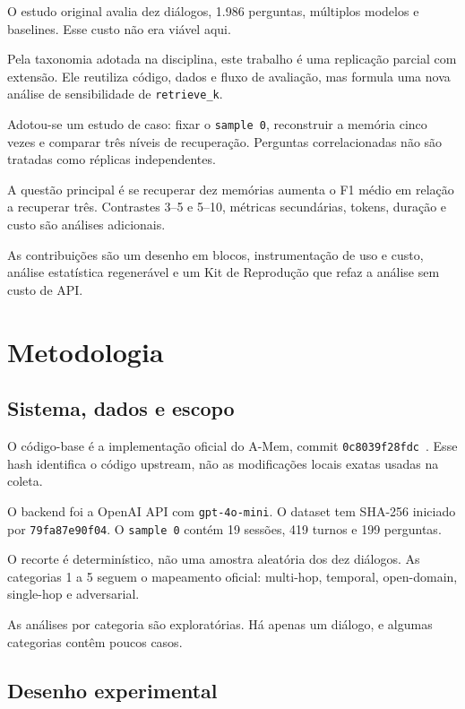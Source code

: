 \documentclass[sigconf]{acmart}
\begin{document}
O estudo original avalia dez diálogos, 1.986 perguntas, múltiplos modelos e baselines. Esse custo não era viável aqui.

Pela taxonomia adotada na disciplina, este trabalho é uma replicação parcial com extensão. Ele reutiliza código, dados e fluxo de avaliação, mas formula uma nova análise de sensibilidade de \texttt{retrieve\_k}.

Adotou-se um estudo de caso: fixar o \texttt{sample 0}, reconstruir a memória cinco vezes e comparar três níveis de recuperação. Perguntas correlacionadas não são tratadas como réplicas independentes.

A questão principal é se recuperar dez memórias aumenta o F1 médio em relação a recuperar três. Contrastes 3--5 e 5--10, métricas secundárias, tokens, duração e custo são análises adicionais.

As contribuições são um desenho em blocos, instrumentação de uso e custo, análise estatística regenerável e um Kit de Reprodução que refaz a análise sem custo de API.

\section{Metodologia}

\subsection{Sistema, dados e escopo}

O código-base é a implementação oficial do A-Mem, commit \texttt{0c8039f28fdc}~\cite{xu2025repo}. Esse hash identifica o código upstream, não as modificações locais exatas usadas na coleta.

O backend foi a OpenAI API com \texttt{gpt-4o-mini}. O dataset tem SHA-256 iniciado por \texttt{79fa87e90f04}. O \texttt{sample 0} contém 19 sessões, 419 turnos e 199 perguntas.

O recorte é determinístico, não uma amostra aleatória dos dez diálogos. As categorias 1 a 5 seguem o mapeamento oficial: multi-hop, temporal, open-domain, single-hop e adversarial.

As análises por categoria são exploratórias. Há apenas um diálogo, e algumas categorias contêm poucos casos.

\subsection{Desenho experimental}
\end{document}
